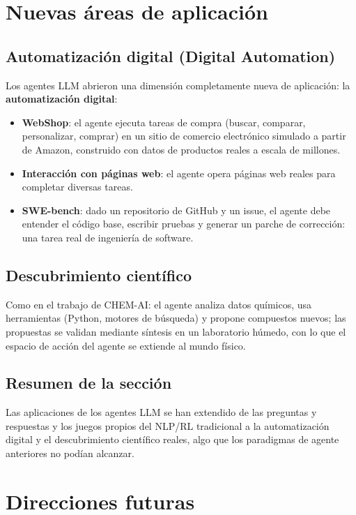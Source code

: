 \documentclass[a4paper]{article}
\begin{document}
\section{Nuevas áreas de aplicación}

\subsection{Automatización digital (Digital Automation)}

Los agentes LLM abrieron una dimensión completamente nueva de aplicación: la \textbf{automatización digital}:

\begin{itemize}
    \item \textbf{WebShop}: el agente ejecuta tareas de compra (buscar, comparar, personalizar, comprar) en un sitio de comercio electrónico simulado a partir de Amazon, construido con datos de productos reales a escala de millones.
    \item \textbf{Interacción con páginas web}: el agente opera páginas web reales para completar diversas tareas.
    \item \textbf{SWE-bench}: dado un repositorio de GitHub y un issue, el agente debe entender el código base, escribir pruebas y generar un parche de corrección: una tarea real de ingeniería de software.
\end{itemize}

\subsection{Descubrimiento científico}

Como en el trabajo de CHEM-AI: el agente analiza datos químicos, usa herramientas (Python, motores de búsqueda) y propone compuestos nuevos; las propuestas se validan mediante síntesis en un laboratorio húmedo, con lo que el espacio de acción del agente se extiende al mundo físico.

\subsection{Resumen de la sección}

Las aplicaciones de los agentes LLM se han extendido de las preguntas y respuestas y los juegos propios del NLP/RL tradicional a la automatización digital y el descubrimiento científico reales, algo que los paradigmas de agente anteriores no podían alcanzar.
\section{Direcciones futuras}
\end{document}
